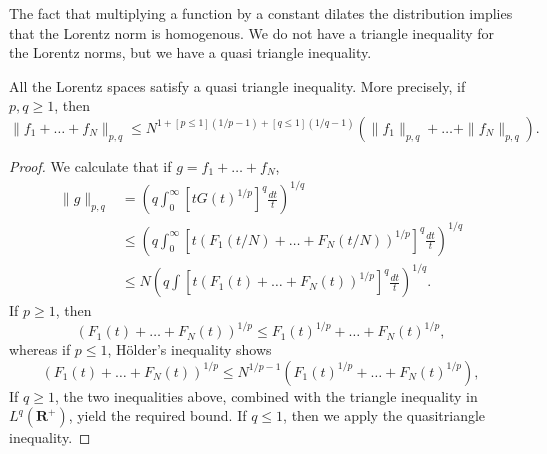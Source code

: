 The fact that multiplying a function by a constant dilates the distribution implies that the Lorentz norm is homogenous. We do not have a triangle inequality for the Lorentz norms, but we have a quasi triangle inequality.

\begin{theorem}
    All the Lorentz spaces satisfy a quasi triangle inequality. More precisely, if $p,q \geq 1$, then
    \[ \| f_1 + \dots + f_N \|_{p,q} \leq N^{1 + [p \leq 1](1/p - 1) + [q \leq 1](1/q - 1)} \left( \| f_1 \|_{p,q} + \dots + \| f_N \|_{p,q} \right). \]
\end{theorem}
\begin{proof}
    We calculate that if $g = f_1 + \dots + f_N$,
    \begin{align*}
    \| g \|_{p,q} &= \left( q \int_0^\infty \left[t G(t)^{1/p} \right]^q \frac{dt}{t} \right)^{1/q}\\
    &\leq \left( q \int_0^\infty \left[ t (F_1(t/N) + \dots + F_N(t/N))^{1/p} \right]^q \frac{dt}{t} \right)^{1/q}\\
    &\leq N \left( q \int \left[ t \left( F_1(t) + \dots + F_N(t) \right)^{1/p} \right]^q \frac{dt}{t} \right)^{1/q}.
  \end{align*}
  If $p \geq 1$, then
  \[ \left( F_1(t) + \dots + F_N(t) \right)^{1/p} \leq F_1(t)^{1/p} + \dots + F_N(t)^{1/p}, \]
  whereas if $p \leq 1$, H\"{o}lder's inequality shows
  \[ \left( F_1(t) + \dots + F_N(t) \right)^{1/p} \leq N^{1/p - 1} \left( F_1(t)^{1/p} + \dots + F_N(t)^{1/p} \right), \]
  If $q \geq 1$, the two inequalities above, combined with the triangle inequality in $L^q(\mathbf{R}^+)$, yield the required bound. If $q \leq 1$, then we apply the quasitriangle inequality.
\end{proof}

